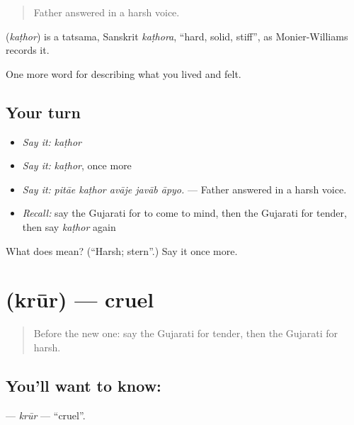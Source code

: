 \begin{quote}
Father answered in a harsh voice.
\end{quote}

\begin{cousinweb}
\textbf{} (\emph{kaṭhor}) is a tatsama, Sanskrit \emph{kaṭhora}, \textquotedblleft{}hard, solid, stiff\textquotedblright{}, as Monier-Williams records it.
\end{cousinweb}

\begin{grammarlens}[title={What you've built}]
One more word for describing what you lived and felt.
\end{grammarlens}

\subsection*{Your turn}
\begin{itemize}
\raggedright
  \item \emph{Say it:} \emph{kaṭhor}
  \item \emph{Say it:} \emph{kaṭhor}, once more
  \item \emph{Say it:} \emph{pitāe kaṭhor avāje javāb āpyo.} — Father answered in a harsh voice.
  \item \emph{Recall:} say the Gujarati for to come to mind, then the Gujarati for tender, then say \emph{kaṭhor} again
\end{itemize}

\begin{tcolorbox}[breakable,colback=teal!4,colframe=teal!35!black,title={Before you move on}]
What does  mean? (\textquotedblleft{}Harsh; stern\textquotedblright{}.) Say it once more.
\end{tcolorbox}
\section[\texorpdfstring{\gu{ક્રૂર} (krūr)}{ક્રૂર (krūr)}]{ (krūr) — cruel}

\label{lesson:GU-C459-krur}



\begin{quote}
Before the new one: say the Gujarati for tender, then the Gujarati for harsh.
\end{quote}

\subsection*{You'll want to know: }
\textbf{} — \emph{krūr} — \textquotedblleft{}cruel\textquotedblright{}.

